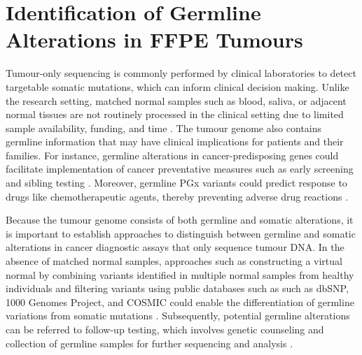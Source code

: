 
\chapter{Identification of Germline Alterations in FFPE Tumours}
\label{ch:IdentificationofGermlineAlterationsinFFPETumours}

Tumour-only sequencing is commonly performed by clinical laboratories to detect targetable somatic mutations, which can inform clinical decision making. Unlike the research setting, matched normal samples such as blood, saliva, or adjacent normal tissues are not routinely processed in the clinical setting due to limited sample availability, funding, and time \cite{Frampton2013, Fumagalli2010, Lin2014, Wong2014a}. The tumour genome also contains germline information that may have clinical implications for patients and their families. For instance, germline alterations in cancer-predisposing genes could facilitate implementation of cancer preventative measures such as early screening and sibling testing \cite{Schrader2015, Meric-Bernstam2016}. Moreover, germline PGx variants could predict response to drugs like chemotherapeutic agents, thereby preventing adverse drug reactions \cite{McLeod2013, Dai2008, Lee2014, Morel2006, VanKuilenburg2016, Etienne-Grimaldi2010, Mohelnikova-Duchonova2014, Jennings2013}.

Because the tumour genome consists of both germline and somatic alterations, it is important to establish approaches to distinguish between germline and somatic alterations in cancer diagnostic assays that only sequence tumour DNA. In the absence of matched normal samples, approaches such as constructing a virtual normal by combining variants identified in multiple normal samples from healthy individuals and filtering variants using public databases such as such as dbSNP, 1000 Genomes Project, and COSMIC could enable the differentiation of germline variations from somatic mutations \cite{Hiltemann2015, Jones2015a}. Subsequently, potential germline alterations can be referred to follow-up testing, which involves genetic counseling and collection of germline samples for further sequencing and analysis \cite{Raymond2016, Bombard2014, Green2013}.


